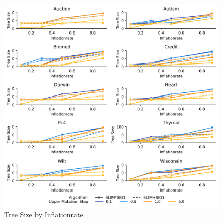 
    \begin{figure}[H]
    \centering
    \includegraphics[width=\linewidth]{../Latex/Chapters/Figures/Results/inflationrate_test_tree_size_by_p_inflate.png}
    \caption{Tree Size by Inflationrate}
    \label{fig:inflationrate_test_tree_size_by_p_inflate}
    \end{figure}
    